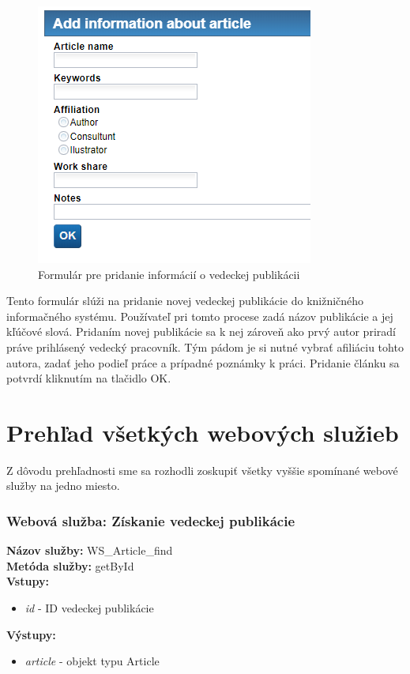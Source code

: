 \documentclass[10pt,oneside,slovak,a4paper]{article}
\begin{document}
\begin{figure} [H]
\centering
\includegraphics[scale=0.4]{forms/Coachforaddinginformationaboutarticle.png} 
\caption{Formulár pre pridanie informácií o vedeckej publikácii}
\end{figure}

Tento formulár slúži na pridanie novej vedeckej publikácie do knižničného informačného systému. Používateľ pri tomto procese zadá názov publikácie a jej kľúčové slová. Pridaním novej publikácie sa k nej zároveň ako prvý autor priradí práve prihlásený vedecký pracovník. Tým pádom je si nutné vybrať afiliáciu tohto autora, zadať jeho podieľ práce a prípadné poznámky k práci. Pridanie článku sa potvrdí kliknutím na tlačidlo OK.

\section{Prehľad všetkých webových služieb}
Z dôvodu prehľadnosti sme sa rozhodli zoskupiť všetky vyššie spomínané webové služby na jedno miesto.

\subsubsection{Webová služba: Získanie vedeckej publikácie}
\textbf{Názov služby:} WS\_Article\_find\\
\textbf{Metóda služby:} getById\\
\textbf{Vstupy:}\\
	\begin{itemize}
		\item \textit{id} - ID vedeckej publikácie
	\end{itemize}
\textbf{Výstupy:}
	\begin{itemize}
		\item \textit{article} - objekt typu Article
	\end{itemize}
	
\end{document}
